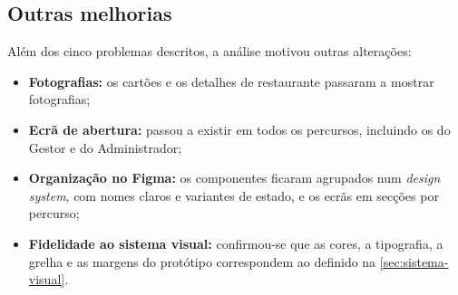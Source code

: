 
\subsection{Outras melhorias}

Além dos cinco problemas descritos, a análise motivou outras alterações:

\begin{itemize}
  \item \textbf{Fotografias:} os cartões e os detalhes de restaurante passaram a mostrar
        fotografias;
  \item \textbf{Ecrã de abertura:} passou a existir em todos os percursos, incluindo os do Gestor
        e do Administrador;
  \item \textbf{Organização no Figma:} os componentes ficaram agrupados num \textit{design
        system}, com nomes claros e variantes de estado, e os ecrãs em secções por percurso;
  \item \textbf{Fidelidade ao sistema visual:} confirmou-se que as cores, a tipografia, a grelha
        e as margens do protótipo correspondem ao definido na \autoref{sec:sistema-visual}.
\end{itemize}
